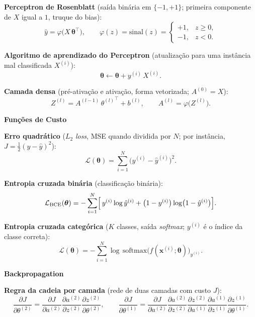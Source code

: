 \documentclass[11pt,a4paper]{article}
\newcommand{\thetav}{\boldsymbol{\theta}}
\newcommand{\bloco}[1]{%
  \par\vspace{0.3em}%
  {\bfseries\large #1}\par%
  \vspace{-0.4em}{\color{gray!60}\rule{\linewidth}{0.4pt}}\par%
}
\begin{document}
\textbf{Perceptron de Rosenblatt} (saída binária em $\{-1, +1\}$; primeira componente de $X$ igual a $1$, truque do bias):
\[
  \hat{y} = \varphi\bigl(X\,\thetav^{\top}\bigr),
  \qquad
  \varphi(z) = \mathrm{sinal}(z) =
  \begin{cases}
    +1, & z \geq 0,\\
    -1, & z < 0.
  \end{cases}
\]

\textbf{Algoritmo de aprendizado do Perceptron} (atualização para uma instância mal classificada $X^{(i)}$):
\[
  \thetav \leftarrow \thetav + y^{(i)}\,X^{(i)}.
\]

\textbf{Camada densa} (pré-ativação e ativação, forma vetorizada; $A^{(0)} = X$):
\[
  Z^{(l)} = A^{(l-1)}\,{\theta^{(l)}}^{\top} + b^{(l)}, \qquad A^{(l)} = \varphi\bigl(Z^{(l)}\bigr).
\]

\bloco{Funções de Custo}

\textbf{Erro quadrático} ($L_2$ \textit{loss}, MSE quando dividida por $N$; por instância, $J = \tfrac{1}{2}(y - \hat{y})^{2}$):
\[
  \mathcal{L}(\thetav) = \sum_{i=1}^{N} \bigl(y^{(i)} - \hat{y}^{(i)}\bigr)^{2}.
\]

\textbf{Entropia cruzada binária} (classificação binária):
\[
  \mathcal{L}_{\text{BCE}}(\thetav) = -\sum_{i=1}^{N} \Bigl[\, y^{(i)} \log \hat{y}^{(i)} + \bigl(1 - y^{(i)}\bigr) \log\bigl(1 - \hat{y}^{(i)}\bigr) \Bigr].
\]

\textbf{Entropia cruzada categórica} ($K$ classes, saída \textit{softmax}; $y^{(i)}$ é o índice da classe correta):
\[
  \mathcal{L}(\thetav) = -\sum_{i=1}^{N} \log\,\mathrm{softmax}\bigl(f(\mathbf{x}^{(i)};\thetav)\bigr)_{y^{(i)}}.
\]

\bloco{Backpropagation}

\textbf{Regra da cadeia por camada} (rede de duas camadas com custo $J$):
\[
  \frac{\partial J}{\partial\theta^{(2)}}
    = \frac{\partial J}{\partial a^{(2)}}
      \frac{\partial a^{(2)}}{\partial z^{(2)}}
      \frac{\partial z^{(2)}}{\partial\theta^{(2)}},
  \qquad
  \frac{\partial J}{\partial\theta^{(1)}}
    = \frac{\partial J}{\partial a^{(2)}}
      \frac{\partial a^{(2)}}{\partial z^{(2)}}
      \frac{\partial z^{(2)}}{\partial a^{(1)}}
      \frac{\partial a^{(1)}}{\partial z^{(1)}}
      \frac{\partial z^{(1)}}{\partial\theta^{(1)}}.
\]
\end{document}
